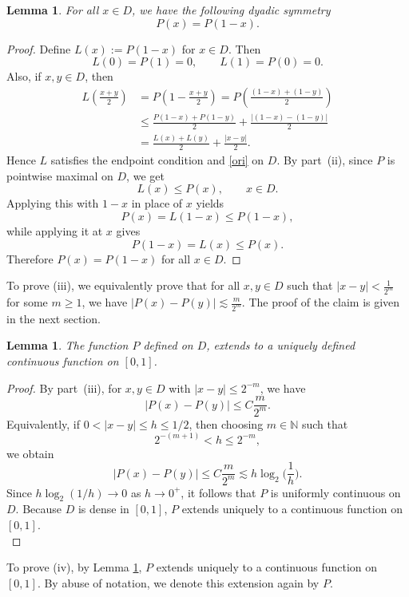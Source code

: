 \documentclass[11pt]{amsart}
\newtheorem{lemma}[theorem]{Lemma}
\theoremstyle{definition}
\renewcommand{\1}{{\mathbbm{1}}}
\begin{document}
\begin{lemma}\label{lem:dyadic-symmetry}
For all $x\in D$, we have the following dyadic symmetry
\[
P(x)=P(1-x).
\]
\end{lemma}

\begin{proof}
Define
$L(x):=P(1-x)$ for $ x\in D.$   
Then
\[
L(0)=P(1)=0,\qquad L(1)=P(0)=0.
\]
Also, if $x,y\in D$, then
\begin{align*}
L\!\left(\frac{x+y}{2}\right)
&=P\!\left(1-\frac{x+y}{2}\right)
 =P\!\left(\frac{(1-x)+(1-y)}{2}\right)\\
&\le \frac{P(1-x)+P(1-y)}{2}+\frac{|(1-x)-(1-y)|}{2}\\
&= \frac{L(x)+L(y)}{2}+\frac{|x-y|}{2}.
\end{align*}
Hence $L$ satisfies the endpoint condition and \eqref{ori} on $D$.
By part~(ii), since $P$ is pointwise maximal on $D$, we get
\[
L(x)\le P(x),\qquad x\in D.
\]
Applying this with $1-x$ in place of $x$ yields
\[
P(x)=L(1-x)\le P(1-x),
\]
while applying it at $x$ gives
\[
P(1-x)=L(x)\le P(x).
\]
Therefore $
P(x)=P(1-x)$ for all $ x\in D.
$
\end{proof}

To prove (iii), we equivalently prove that for all $ x, y \in D $ such that $ |x-y| < \frac{1}{2^m} $ for some $ m \geq 1 $, we have $ |P(x) - P(y)| \lesssim \frac{m}{2^m} $.
The proof of the claim is given in the next section.\\

\begin{lemma}\label{lem:cont_ext}
The function $P$ defined on $D$, extends to a uniquely defined continuous function on $[0,1]$.
\end{lemma}

\begin{proof}
    
By part~(iii), for $x,y\in D$ with $|x-y|\le 2^{-m}$, we have
\[
|P(x)-P(y)|\le C\frac{m}{2^m}.
\]
Equivalently, if $0<|x-y|\le h\le 1/2$, then choosing $m\in\mathbb N$ such that
\[
2^{-(m+1)}<h\le 2^{-m},
\]
we obtain
\[
|P(x)-P(y)|\le C\frac{m}{2^m}
\lesssim h\log_2\!\Big(\frac1h\Big).
\]
Since $h\log_2(1/h)\to 0$ as $h\to 0^+$, it follows that $P$ is uniformly
continuous on $D$. Because $D$ is dense in $[0,1]$, $P$ extends uniquely to a
continuous function on $[0,1]$.\\
\end{proof}


To prove (iv), by Lemma \ref{lem:cont_ext}, $P$ extends uniquely to a continuous function on
$[0,1]$. By abuse of notation, we denote this extension again by $P$.
\end{document}
